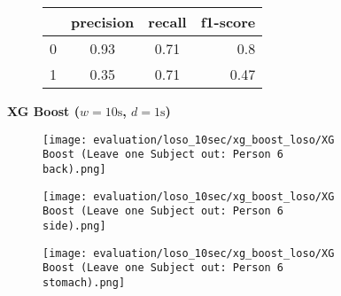 \begin{figure}[ht!]
    \begin{subfigure}{1\textwidth}
        \begin{center}
            \begin{tabular}{ | l | c | c | r | }
              \hline
               & precision & recall & f1-score \\ \hline
              0 & 0.93 & 0.71 & 0.8 \\ \hline
              1 & 0.35 & 0.71 & 0.47 \\
              \hline
            \end{tabular}
        \end{center}
    \end{subfigure}
    \newline
    \vspace*{1 cm}
    \newline
    \textbf{XG Boost ($w=10\si{\s}$, $d=1\si{\s}$)}
    \begin{subfigure}{1\textwidth}
      \texttt{[image: evaluation/loso\_10sec/xg\_boost\_loso/XG Boost (Leave one Subject out: Person 6 back).png]}
    \end{subfigure}
    \begin{subfigure}{1\textwidth}
      \texttt{[image: evaluation/loso\_10sec/xg\_boost\_loso/XG Boost (Leave one Subject out: Person 6 side).png]}
    \end{subfigure}
    \begin{subfigure}{1\textwidth}
      \texttt{[image: evaluation/loso\_10sec/xg\_boost\_loso/XG Boost (Leave one Subject out: Person 6 stomach).png]}
  \end{subfigure}


\end{figure}
